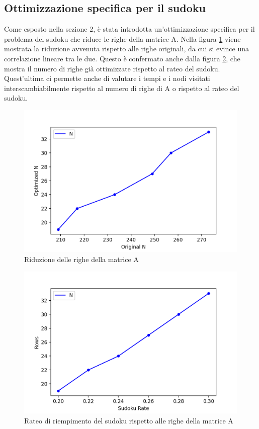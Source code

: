 \subsection{Ottimizzazione specifica per il sudoku}
Come esposto nella sezione 2, è stata introdotta un'ottimizzazione specifica per il problema del sudoku che riduce le righe della matrice A. Nella figura \ref{row:opt} viene mostrata la riduzione avvenuta rispetto alle righe originali, da cui si evince una correlazione lineare tra le due. Questo è confermato anche dalla figura \ref{rate:row}, che mostra il numero di righe già ottimizzate rispetto al rateo del sudoku. Quest'ultima ci permette anche di valutare i tempi e i nodi visitati interscambiabilmente rispetto al numero di righe di A o rispetto al rateo del sudoku.

\begin{figure}[h!]
\centering
\includegraphics[width=0.8\linewidth]{figures/sudoku/s3_opt_row.png}
\caption{Riduzione delle righe della matrice A}\label{row:opt}
\end{figure}

\begin{figure}[h!]
\centering
\includegraphics[width=0.8\linewidth]{figures/sudoku/s3_rate_row.png}
\caption{Rateo di riempimento del sudoku rispetto alle righe della matrice A}\label{rate:row}
\end{figure}

